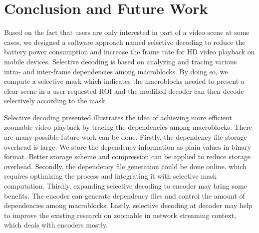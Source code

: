 \section{Conclusion and Future Work}
Based on the fact that users are only interested in part of a video scene at some cases, we designed a software approach named selective decoding to reduce the battery power consumption and increase the frame rate for HD video playback on mobile devices. Selective decoding is based on analyzing and tracing various intra- and inter-frame dependencies among macroblocks. By doing so, we compute a selective mask which indicates the macroblocks needed to present a clear scene in a user requested ROI and the modified decoder can then decode selectively according to the mask. 

Selective decoding presented illustrates the idea of achieving more efficient zoomable video playback by tracing the dependencies among macroblocks. There are many possible future work can be done. Firstly, the dependency file storage overhead is large. We store the dependency information as plain values in binary format. Better storage scheme and compression can be applied to reduce storage overhead. Secondly, the dependency file generation could be done online, which requires optimizing the process and integrating it with selective mask computation. Thirdly, expanding selective decoding to encoder may bring some benefits. The encoder can generate dependency files and control the amount of dependencies among macroblocks. Lastly, selective decoding at decoder may help to improve the existing research on zoomable in network streaming context, which deals with encoders mostly. 
